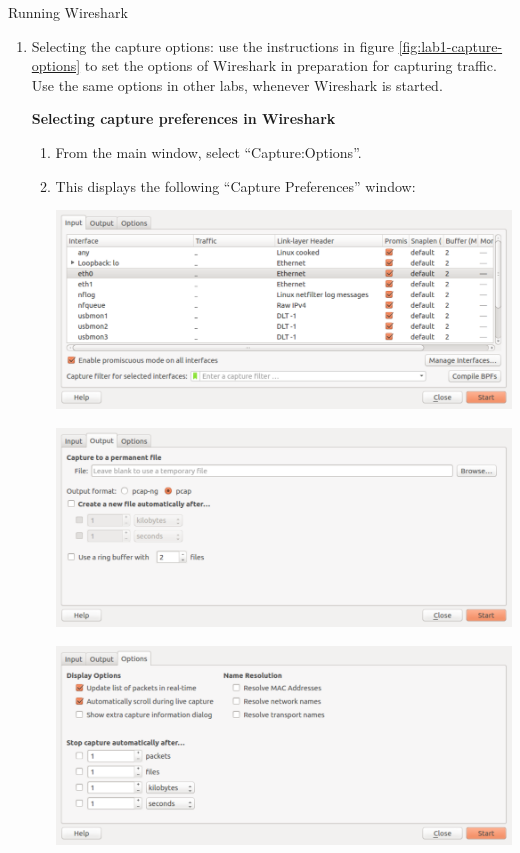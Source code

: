 \begin{exercise}{Running Wireshark}
\begin{enumerate}
	This displays the Wireshark main window on your desktop as shown in figure \ref{fig:lab1-wireshark-main}.
	\item Selecting the capture options: use the instructions in figure \ref{fig:lab1-capture-options} to set the options of Wireshark in preparation for capturing traffic. Use the same options in other labs, whenever Wireshark is started.
		\par
		\begin{minipage}{\linewidth}
			\begin{framed}
				\centering
				\textbf{Selecting capture preferences in Wireshark}
				\begin{enumerate}
					\item From the main window, select ``Capture:Options''.
					\item This displays the following ``Capture Preferences'' window:\par
						\includegraphics[width=0.85\linewidth]{graphics/wireshark-capture-options-1}
						\par
						\includegraphics[width=0.85\linewidth]{graphics/wireshark-capture-options-2}
						\par
						\includegraphics[width=0.85\linewidth]{graphics/wireshark-capture-options-3}

\end{enumerate}
\end{framed}
\end{minipage}
\end{enumerate}
\end{exercise}
